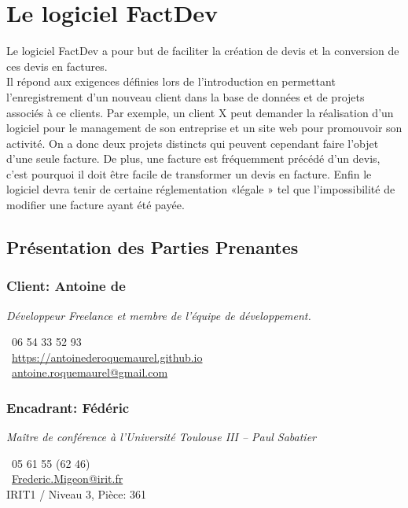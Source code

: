 \section{Le logiciel FactDev}
Le logiciel FactDev a pour but de faciliter la création de devis et la conversion de ces devis en factures. \\
Il répond aux exigences définies lors de l'introduction en permettant l'enregistrement d'un nouveau client dans la base de données et de projets associés à ce clients. Par exemple, un client X peut demander la réalisation d'un logiciel pour le management de son entreprise et un site web pour promouvoir son activité. On a donc deux projets distincts qui peuvent cependant faire l'objet d'une seule facture. De plus, une facture est fréquemment précédé d'un devis, c'est pourquoi il doit être facile de transformer un devis en facture. Enfin le logiciel devra tenir de certaine réglementation «légale » tel que l'impossibilité de modifier une facture ayant été payée. 

\subsection{Présentation des Parties Prenantes}
	\subsubsection{Client: Antoine de }
	\begin{flushleft} \textit{Développeur Freelance et membre de l'équipe de développement. }

		\Telefon~06 54 33 52 93\\
		\Mundus~\url{https://antoinederoquemaurel.github.io}\\
		\Letter~\href{mailto:antoine.roquemaurel@gmail.com}{antoine.roquemaurel@gmail.com} \\		
\end{flushleft}
	\subsubsection{Encadrant: Fédéric }
	\begin{flushleft} 
	\textit{Maître de conférence à l'Université Toulouse III -- Paul Sabatier}

		\Telefon~05 61 55 (62 46) \\
		\Letter~\href{mailto:Frederic.Migeon@irit.fr}{Frederic.Migeon@irit.fr} \\
		IRIT1 / Niveau 3, Pièce: 361 \\
\end{flushleft}
